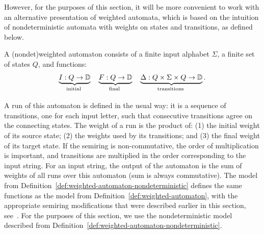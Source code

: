 However, for the purposes of this section, it  will be more convenient to work
with an alternative presentation of weighted automata, which is based on the
intuition of nondeterministic automata with weights on states and transitions,
as defined below. 
\begin{definition}
    \label{def:weighted-automaton-nondeterministic}
    \AP
    A \intro(nondet){weighted automaton} consists of a finite input alphabet $\Sigma$,  a finite set of states $Q$, and functions: 
    \begin{align}
        \label{eq:weight-functions}
    \myunderbrace{I : Q \to \domain}{initial}
    \quad
    \myunderbrace{F : Q \to \domain}{final}
    \quad
    \myunderbrace{\Delta : Q \times \Sigma \times Q \to \domain}{transitions}.
    \end{align}
\end{definition}
A run of this automaton is defined in the usual way: it is a sequence of
transitions, one for each input letter, such that consecutive transitions
agree on the connecting states. The weight of a run is the product of: (1) the
initial weight of its source state; (2) the weights used by its transitions;
and (3) the final weight of its target state. If the semiring is
non-commutative, the order of multiplication is  important, and transitions
are multiplied in the order corresponding to the input string. For an input
string, the output of the automaton is the sum of weights of all runs over
this automaton (sum is always commutative).  The model from
Definition~\ref{def:weighted-automaton-nondeterministic}  defines the same
functions as the model from Definition~\ref{def:weighted-automaton}, with the
appropriate semiring modifications that were described earlier in this
section, see~\cite[Lemma 8.3]{bojanczyk_automata_2025}. For the purposes of
this section, we use the nondeterministic  model described from
Definition~\ref{def:weighted-automaton-nondeterministic}.


